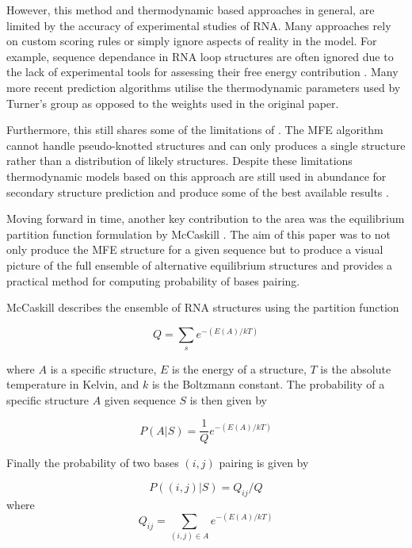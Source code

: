 \documentclass[journal]{IEEEtran}
\begin{document}
However, this method and thermodynamic based approaches in general, are limited by the accuracy of experimental studies of RNA. Many approaches rely on custom scoring rules or simply ignore aspects of reality in the model. For example, sequence dependance in RNA loop structures are often ignored due to the lack of experimental tools for assessing their free energy contribution \cite{do2006contrafold}. Many more recent prediction algorithms utilise the thermodynamic parameters used by Turner's group \cite{mathews1999expanded} as opposed to the weights used in the original paper. 

Furthermore, this still shares some of the limitations of \cite{nussinov1980fast}. The MFE algorithm cannot handle pseudo-knotted structures and can only produces a single structure rather than a distribution of likely structures. Despite these limitations thermodynamic models based on this approach are still used in abundance for secondary structure prediction and produce some of the best available results \cite{laing2010computational} \cite{rivas2013four}.

Moving forward in time, another key contribution to the area was the equilibrium partition function formulation by McCaskill \cite{mccaskill1990equilibrium}. The aim of this paper was to not only produce the MFE structure for a given sequence but to produce a visual picture of the full ensemble of alternative equilibrium structures and provides a practical method for computing probability of bases pairing. 

McCaskill describes the ensemble of RNA structures using the partition function

\begin{equation}
	Q = \sum_s e^{-(E(A)/kT)}
\end{equation} 

where $A$ is a specific structure, $E$ is the energy of a structure, $T$ is the absolute temperature in Kelvin, and $k$ is the Boltzmann constant. The probability of a specific structure $A$ given sequence $S$ is then given by

\begin{equation}
	P(A|S) = \frac{1}{Q} e^{-(E(A)/kT)}	
\end{equation}

Finally the probability of two bases $(i, j)$ pairing is given by

\begin{equation}
	P((i,j)|S) = Q_{ij} / Q
\end{equation}
where
\begin{equation}
	Q_{ij} = \sum_{(i,j) \in A} e^{-(E(A)/kT)}
\end{equation}
\end{document}
